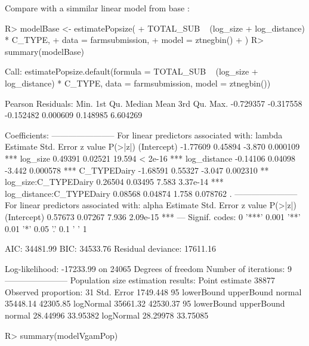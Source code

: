 \documentclass[
]{jss}
\newcommand{\1}{\mathcal{I}} \newcommand{\bx}{\boldsymbol{x}}
\begin{document}
Compare with a simmilar linear model from base :
\small

\begin{CodeChunk}
\begin{CodeInput}
R> modelBase <- estimatePopsize(
+   TOTAL_SUB ~ (log_size + log_distance) * C_TYPE,
+   data = farmsubmission,
+   model = ztnegbin()
+ )
R> summary(modelBase)
\end{CodeInput}
\begin{CodeOutput}

Call:
estimatePopsize.default(formula = TOTAL_SUB ~ (log_size + log_distance) * 
    C_TYPE, data = farmsubmission, model = ztnegbin())

Pearson Residuals:
     Min.   1st Qu.    Median      Mean   3rd Qu.      Max. 
-0.729357 -0.317558 -0.152482  0.000609  0.148985  6.604269 

Coefficients:
-----------------------
For linear predictors associated with: lambda 
                         Estimate Std. Error z value  P(>|z|)    
(Intercept)              -1.77609    0.45894  -3.870 0.000109 ***
log_size                  0.49391    0.02521  19.594  < 2e-16 ***
log_distance             -0.14106    0.04098  -3.442 0.000578 ***
C_TYPEDairy              -1.68591    0.55327  -3.047 0.002310 ** 
log_size:C_TYPEDairy      0.26504    0.03495   7.583 3.37e-14 ***
log_distance:C_TYPEDairy  0.08568    0.04874   1.758 0.078762 .  
-----------------------
For linear predictors associated with: alpha 
            Estimate Std. Error z value  P(>|z|)    
(Intercept)  0.57673    0.07267   7.936 2.09e-15 ***
---
Signif. codes:  0 '***' 0.001 '**' 0.01 '*' 0.05 '.' 0.1 ' ' 1

AIC: 34481.99
BIC: 34533.76
Residual deviance: 17611.16

Log-likelihood: -17233.99 on 24065 Degrees of freedom 
Number of iterations: 9
-----------------------
Population size estimation results: 
Point estimate 38877
Observed proportion: 31%
Std. Error 1749.448
95%
          lowerBound upperBound
normal      35448.14   42305.85
logNormal   35661.32   42530.37
95%
          lowerBound upperBound
normal      28.44996   33.95382
logNormal   28.29978   33.75085
\end{CodeOutput}
\begin{CodeInput}
R> summary(modelVgamPop)
\end{CodeInput}
\begin{CodeOutput}


\end{CodeOutput}
\end{CodeChunk}
\end{document}
